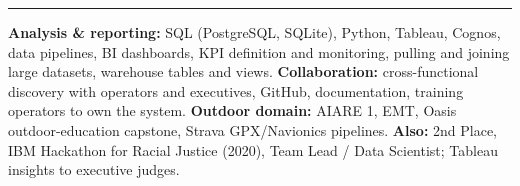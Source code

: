 \documentclass[10pt,letterpaper]{article}
\newcommand{\cvsection}[1]{%
  \vspace{7pt}%
  \noindent{\bfseries\fontsize{11pt}{13pt}\selectfont\MakeUppercase{#1}}\par
  \vspace{1pt}%
  \noindent\rule{\textwidth}{0.4pt}\par
  \vspace{4pt}%
}
\begin{document}
\cvsection{Skills}

{\raggedright
\noindent\textbf{Analysis \& reporting:} SQL (PostgreSQL, SQLite), Python, Tableau, Cognos, data pipelines, BI dashboards, KPI definition and monitoring, pulling and joining large datasets, warehouse tables and views. \textbf{Collaboration:} cross-functional discovery with operators and executives, GitHub, documentation, training operators to own the system. \textbf{Outdoor domain:} AIARE 1, EMT, Oasis outdoor-education capstone, Strava GPX/Navionics pipelines. \textbf{Also:} 2nd Place, IBM Hackathon for Racial Justice (2020), Team Lead / Data Scientist; Tableau insights to executive judges.\par
}
\end{document}
